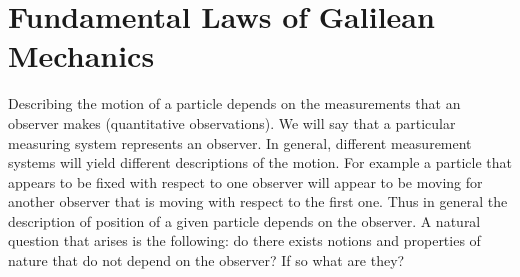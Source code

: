 \documentclass[graybox,envcountchap,sectrefs]{svmonoMuga}
\begin{document}
\section{Fundamental Laws of Galilean Mechanics}\label{Secn:GalileanMechanics}

Describing the motion of a particle depends on the measurements that an observer makes (quantitative observations). We will say that a particular measuring system represents an observer. In general, different measurement systems will yield different descriptions of the motion. For example a particle that appears to be fixed with respect to one observer will appear to be moving for another observer that is moving with respect to the first one. Thus in general the description of position of a given particle depends on the observer. A natural question that arises is the following: do there exists notions and properties of nature that do not depend on the observer? If so what are they? 
\end{document}
